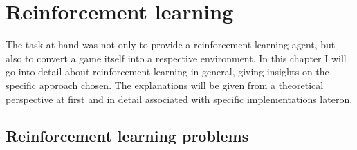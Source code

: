 \chapter{Reinforcement learning}

\label{ch:RL} 

\newcommand{\inlinecode}[1]{\colorbox{evenmorelightgray}{\lstinline[basicstyle=\ttfamily\color{black}]{#1}}}


The task at hand was not only to provide a reinforcement learning agent, but also to convert a game itself into a respective environment. In this chapter I will go into detail about reinforcement learning in general, giving insights on the specific approach chosen. The explanations will be given from a theoretical perspective at first and in detail associated with specific implementations lateron.


\section{Reinforcement learning problems}

